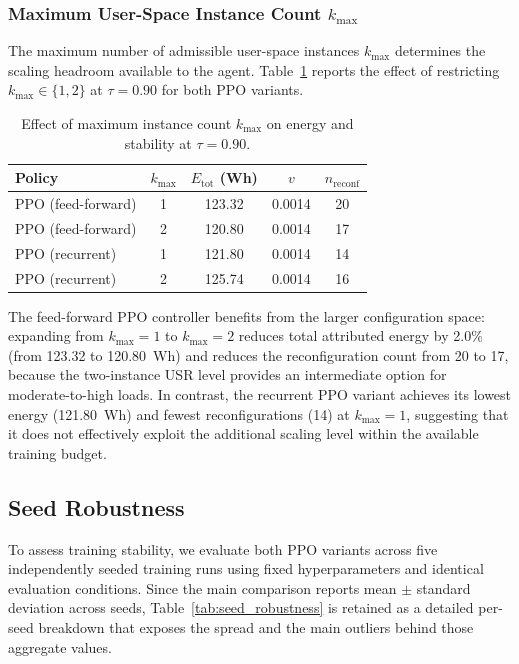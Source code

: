 \documentclass[a4paper,fleqn]{cas-sc}
\begin{document}
\subsubsection{Maximum User-Space Instance Count $k_{\max}$}
\label{subsubsec:sensitivity_k}

The maximum number of admissible user-space instances $k_{\max}$ determines the scaling headroom available to the agent. Table~\ref{tab:sensitivity_k} reports the effect of restricting $k_{\max} \in \{1,2\}$ at $\tau=0.90$ for both PPO variants.

\begin{table}[width=.9\linewidth,cols=5,pos=h]
\centering
\caption{Effect of maximum instance count $k_{\max}$ on energy and stability at $\tau=0.90$.}
\label{tab:sensitivity_k}
\begin{tabular}{l c c c c}
\hline
Policy & $k_{\max}$ & $E_{\mathrm{tot}}$ (Wh) & $v$ & $n_{\mathrm{reconf}}$ \\
\hline
PPO (feed-forward) & 1 & 123.32 & 0.0014 & 20 \\
PPO (feed-forward) & 2 & 120.80 & 0.0014 & 17 \\
PPO (recurrent)    & 1 & 121.80 & 0.0014 & 14 \\
PPO (recurrent)    & 2 & 125.74 & 0.0014 & 16 \\
\hline
\end{tabular}
\end{table}

The feed-forward PPO controller benefits from the larger configuration space: expanding from $k_{\max}=1$ to $k_{\max}=2$ reduces total attributed energy by 2.0\% (from 123.32 to 120.80~Wh) and reduces the reconfiguration count from 20 to 17, because the two-instance USR level provides an intermediate option for moderate-to-high loads. In contrast, the recurrent PPO variant achieves its lowest energy (121.80~Wh) and fewest reconfigurations (14) at $k_{\max}=1$, suggesting that it does not effectively exploit the additional scaling level within the available training budget.

\subsection{Seed Robustness}
\label{subsec:seed_robustness}

To assess training stability, we evaluate both PPO variants across five independently seeded training runs using fixed hyperparameters and identical evaluation conditions. Since the main comparison reports mean $\pm$ standard deviation across seeds, Table~\ref{tab:seed_robustness} is retained as a detailed per-seed breakdown that exposes the spread and the main outliers behind those aggregate values.
\end{document}
